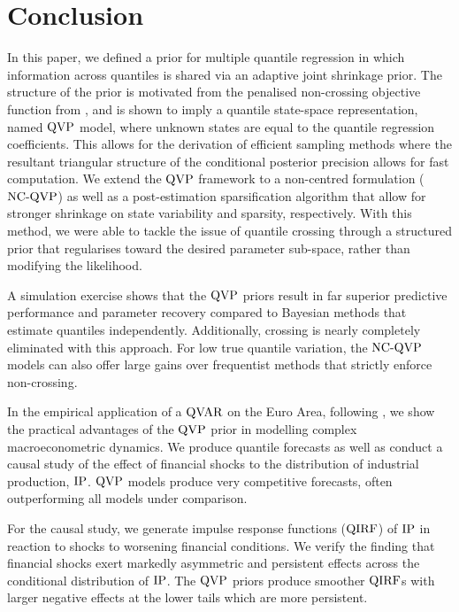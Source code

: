 \section{Conclusion}\label{sec:conclusion}

In this paper, we defined a prior for multiple quantile regression in which information across quantiles is shared via an adaptive joint shrinkage prior. The structure of the prior is motivated from the penalised non-crossing objective function from \citet{bondell2010noncrossing}, and is shown to imply a quantile state-space representation, named $\operatorname{QVP}$ model, where unknown states are equal to the quantile regression coefficients. This allows for the derivation of efficient sampling methods where the resultant triangular structure of the conditional posterior precision allows for fast computation. We extend the $\operatorname{QVP}$ framework to a non-centred formulation ($\operatorname{NC-QVP}$) as well as a post-estimation sparsification algorithm that allow for stronger shrinkage on state variability and sparsity, respectively. With this method, we were able to tackle the issue of quantile crossing through a structured prior that regularises toward the desired parameter sub-space, rather than modifying the likelihood. 
     
A simulation exercise shows that the $\operatorname{QVP}$ priors result in far superior predictive performance and parameter recovery compared to Bayesian methods that estimate quantiles independently. Additionally, crossing is nearly completely eliminated with this approach. For low true quantile variation, the $\operatorname{NC-QVP}$ models can also offer large gains over frequentist methods that strictly enforce non-crossing.
    
In the empirical application of a $\operatorname{QVAR}$ on the Euro Area, following \citet{chavleishvili2024forecasting}, we show the practical advantages of the $\operatorname{QVP}$ prior in modelling complex macroeconometric dynamics. We produce quantile forecasts as well as conduct a causal study of the effect of financial shocks to the distribution of industrial production, $\operatorname{IP}$. $\operatorname{QVP}$ models produce very competitive forecasts, often outperforming all models under comparison.
    
For the causal study, we generate impulse response functions ($\operatorname{QIRF}$) of $\operatorname{IP}$ in reaction to shocks to worsening financial conditions. We verify the finding that financial shocks exert markedly asymmetric and persistent effects across the conditional distribution of $\operatorname{IP}$. The $\operatorname{QVP}$ priors produce smoother $\operatorname{QIRF}$s with larger negative effects at the lower tails which are more persistent.

